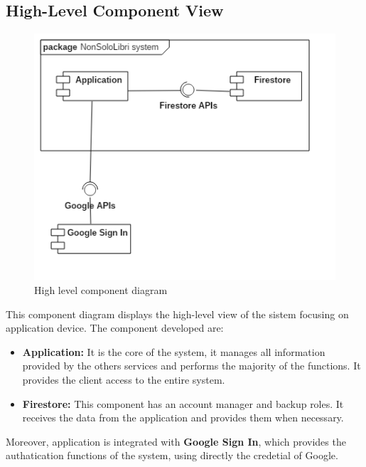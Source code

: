 \subsection{High-Level Component View}
\begin{figure}[!h]
    \centering
    \includegraphics[scale=0.5]{images/high-level-component-view.png}
    \caption{High level component diagram}
    \label{ref:highlevelcomponentdiagram}
\end{figure}
This component diagram displays the high-level view of the sistem focusing on application device.
The component developed are:
\begin{itemize}
    \item
    \textbf{Application:} It is the core of the system, it manages all information provided by the others services
     and performs the majority of the functions. It provides the client access to the entire system.
    \item
    \textbf{Firestore:} This component has an account manager and backup roles. It receives the data from the application and provides them when necessary.
\end{itemize}
Moreover, application is integrated with \textbf{Google Sign In}, which provides the authatication functions of the system, 
using directly the credetial of Google.
\clearpage
